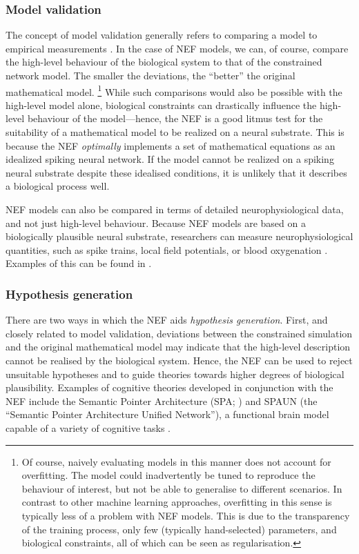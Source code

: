 \subsubsection{Model validation}
The concept of model validation generally refers to comparing a model to empirical measurements \citep{adams2012assessing}.
In the case of NEF models, we can, of course, compare the high-level behaviour of the biological system to that of the constrained network model.
The smaller the deviations, the \enquote{better} the original mathematical model.%
\footnote{Of course, naively evaluating models in this manner does not account for overfitting. The model could inadvertently be tuned to reproduce the behaviour of interest, but not be able to generalise to different scenarios. In contrast to other machine learning approaches, overfitting in this sense is typically less of a problem with NEF models.
This is due to the transparency of the training process, only few (typically hand-selected) parameters, and biological constraints, all of which can be seen as regularisation.}
While such comparisons would also be possible with the high-level model alone, biological constraints can drastically influence the high-level behaviour of the model---hence, the NEF is a good litmus test for the suitability of a mathematical model to be realized on a neural substrate.
This is because the NEF \emph{optimally} implements a set of mathematical equations as an idealized spiking neural network.
If the model cannot be realized on a spiking neural substrate despite these idealised conditions, it is unlikely that it describes a biological process well.

NEF models can also be compared in terms of detailed neurophysiological data, and not just high-level behaviour.
Because NEF models are based on a biologically plausible neural substrate, researchers can measure neurophysiological quantities, such as spike trains, local field potentials, or blood oxy\-gen\-ation \citep[Chapters 5.8~\&~9.4]{eliasmith2013how}.
Examples of this can be found in \citet{stewart2012learning,bekolay2014spiking,duggins2017effects,voelker2018improving,gosmann2021cue}.

\subsubsection{Hypothesis generation}
There are two ways in which the NEF aids \emph{hypothesis generation}.
First, and closely related to model validation, deviations between the constrained simulation and the original mathematical model may indicate that the high-level description cannot be realised by the biological system.
Hence, the NEF can be used to reject unsuitable hypotheses and to guide theories towards higher degrees of biological plausibility.
Examples of cognitive theories developed in conjunction with the NEF include the Semantic Pointer Architecture (SPA; \cite{eliasmith2013how}) and SPAUN (the \enquote{Semantic Pointer Architecture Unified Network}), a functional brain model capable of a variety of cognitive tasks \citep{eliasmith2012largescale}.


